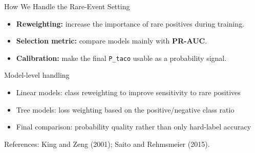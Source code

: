 \begin{frame}{How We Handle the Rare-Event Setting}
  \begin{itemize}
    \item \textbf{Reweighting:} increase the importance of rare positives during training.
    \item \textbf{Selection metric:} compare models mainly with \textbf{PR-AUC}.
    \item \textbf{Calibration:} make the final \texttt{P\_taco} usable as a probability signal.
  \end{itemize}

  \begin{block}{Model-level handling}
    \begin{itemize}
      \item Linear models: class reweighting to improve sensitivity to rare positives
      \item Tree models: loss weighting based on the positive/negative class ratio
      \item Final comparison: probability quality rather than only hard-label accuracy
    \end{itemize}
  \end{block}

  \tiny
  References: King and Zeng (2001); Saito and Rehmsmeier (2015).
\end{frame}
